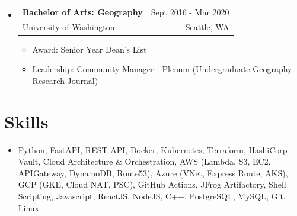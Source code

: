 \documentclass[a4paper,10pt]{article}
\makeatletter
\newcommand{\resumeEdu}[4]{
\vspace{0mm}\item[]
    \begin{tabular*}{\textwidth}[t]{l@{\extracolsep{\fill}}r}
        \hspace{-4.3mm} \small\textbf{#1} & \footnotesize{#3}\vspace{-1mm} \\
        \hspace{-4.3mm} \footnotesize{#2} & \footnotesize{#4}
    \end{tabular*}
    \vspace{-3.2mm}
}
\newcommand{\resumeSubHeadingListStart}{\begin{itemize}[leftmargin=*,labelsep=0mm,itemsep=-2.5mm]}
\newcommand{\resumeItemListStart}{\begin{justify}\begin{itemize}[leftmargin=3ex, rightmargin=2ex, noitemsep,labelsep=1.2mm,itemsep=0mm]\small}
\newcommand{\resumeSubHeadingListEnd}{\end{itemize}\vspace{-2mm}}
\newcommand{\resumeItemListEnd}{\end{itemize}\end{justify}\vspace{-1.5mm}}
\makeatother
\begin{document}
\vspace{-6.0mm}

\resumeSubHeadingListStart
\resumeEdu
{Bachelor of Arts: Geography}
{University of Washington} 
{Sept 2016 - Mar 2020}
{Seattle, WA}
\vspace{-2.0mm}
\resumeItemListStart
\item[$\bullet$] Award: Senior Year Dean's List
\item[$\bullet$] Leadership: Community Manager - Plenum (Undergraduate Geography Research Journal)
\resumeItemListEnd
\resumeSubHeadingListEnd

\vspace{-7mm}

\section{Skills}

\begin{itemize}[left=0pt, itemsep=-1mm]\small
    \item Python, FastAPI, REST API, Docker, Kubernetes, Terraform, HashiCorp Vault, Cloud Architecture \& Orchestration, AWS (Lambda, S3, EC2, APIGateway, DynamoDB, Route53), Azure (VNet, Express Route, AKS), GCP (GKE, Cloud NAT, PSC), GitHub Actions, JFrog Artifactory, Shell Scripting, Javascript, ReactJS, NodeJS, C++, PostgreSQL, MySQL, Git, Linux
\end{itemize}


\end{document}
